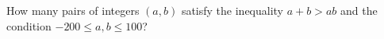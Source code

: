 How many pairs of integers $(a,b)$ satisfy the inequality $a+b>ab$ and the condition $-200 \leqslant a, b\leqslant100$?
